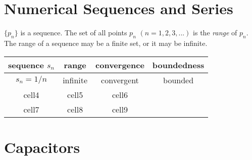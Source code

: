 \documentclass[main.tex]{subfiles}
\begin{document}
\maketitle

\section{Numerical Sequences and Series}

\begin{definition}
$\{ p_n \}$ is a sequence. The set of all points $p_n$ $(n = 1, 2, 3, ...)$ is the \textit{range} of $p_n$. The range of a sequence may be a finite set, or it may be infinite. 
\end{definition} 

\begin{example}
\hspace{1pt}
\begin{center}
\begin{tabular}{ |c|c|c|c| } 
 \hline
 sequence $s_n$ & range & convergence & boundedness \\
 \hline
 $s_n = 1/n$ & infinite & convergent & bounded \\ 
 cell4 & cell5 & cell6 \\ 
 cell7 & cell8 & cell9 \\ 
 \hline
\end{tabular}
\end{center}
\end{example}


\section{Capacitors}
\end{document}
